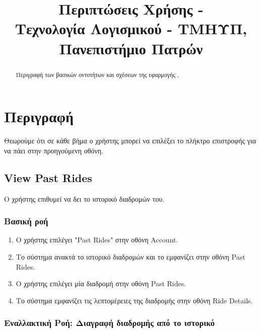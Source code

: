 

\fancyhead[R]{\leftmark}

\title{
    Περιπτώσεις Χρήσης - \appname\\[1ex]
    \large Τεχνολογία Λογισμικού - ΤΜΗΥΠ, Πανεπιστήμιο Πατρών \\[2ex]
}



\maketitle
\thispagestyle{empty}
\newpage

\tableofcontents
\newpage

\begin{abstract}
    Περιγραφή των βασικών οντοτήτων και σχέσεων της εφαρμογής \appname,
\end{abstract}

\newpage

\section{Περιγραφή}

Θεωρούμε ότι σε κάθε βήμα ο χρήστης μπορεί να επιλέξει το πλήκτρο επιστροφής
για να πάει στην προηγούμενη οθόνη.

\subsection{View Past Rides}

Ο χρήστης επιθυμεί να δει το ιστορικό διαδρομών του.

\subsubsection{Βασική ροή}

\begin{enumerate}
    \item Ο χρήστης επιλέγει "Past Rides" στην οθόνη Account.
    \item Το σύστημα ανακτά το ιστορικό διαδρομών και το εμφανίζει στην οθόνη Past Rides.
    \item Ο χρήστης επιλέγει μία διαδρομή στην οθόνη Past Rides.
    \item Το σύστημα εμφανίζει τις λεπτομέρειες της διαδρομής στην οθόνη Ride Details.
\end{enumerate}

\subsubsection{Εναλλακτική Ροή: Διαγραφή διαδρομής από το ιστορικό}

